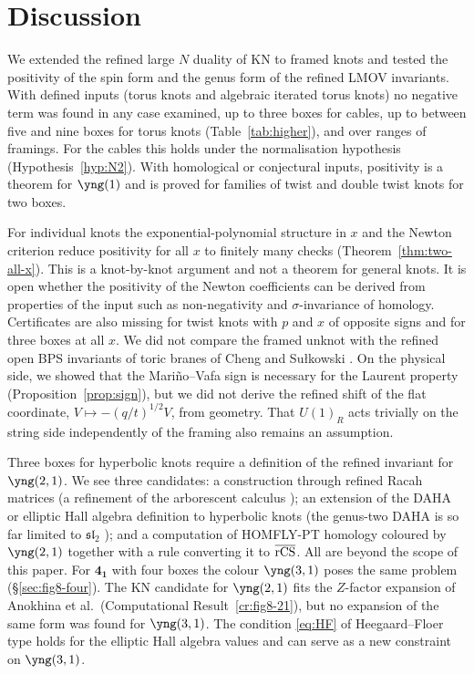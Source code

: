 \section{Discussion}\label{sec:discussion}

We extended the refined large $N$ duality of KN to framed knots and tested the positivity of the spin form and the genus form of the refined LMOV invariants.
With defined inputs (torus knots and algebraic iterated torus knots) no negative term was found in any case examined,
up to three boxes for cables, up to between five and nine boxes for torus knots (Table~\ref{tab:higher}), and over ranges of framings.
For the cables this holds under the normalisation hypothesis (Hypothesis~\ref{hyp:N2}).
With homological or conjectural inputs, positivity is a theorem for $\yng(1)$ and is proved for families of twist and double twist knots for two boxes.

For individual knots the exponential-polynomial structure in $x$ and the Newton criterion reduce positivity for all $x$ to finitely many checks (Theorem~\ref{thm:two-all-x}).
This is a knot-by-knot argument and not a theorem for general knots.
It is open whether the positivity of the Newton coefficients can be derived from properties of the input such as non-negativity and $\sigma$-invariance of homology.
Certificates are also missing for twist knots with $p$ and $x$ of opposite signs and for three boxes at all $x$.
We did not compare the framed unknot with the refined open BPS invariants of toric branes of Cheng and Su\l{}kowski \cite{Cheng21}.
On the physical side, we showed that the Mari\~no--Vafa sign is necessary for the Laurent property (Proposition~\ref{prop:sign}),
but we did not derive the refined shift of the flat coordinate, $V\mapsto-(q/t)^{1/2}V$, from geometry.
That $U(1)_R$ acts trivially on the string side independently of the framing also remains an assumption.

Three boxes for hyperbolic knots require a definition of the refined invariant for $\yng(2,1)$. We see three candidates:
a construction through refined Racah matrices (a refinement of the arborescent calculus \cite{Mironov16});
an extension of the DAHA or elliptic Hall algebra definition to hyperbolic knots (the genus-two DAHA is so far limited to $\mathfrak{sl}_2$ \cite{Arthamonov15});
and a computation of HOMFLY-PT homology coloured by $\yng(2,1)$ together with a rule converting it to $\overline{\mathrm{rCS}}$.
All are beyond the scope of this paper.
For $\mathbf{4_1}$ with four boxes the colour $\yng(3,1)$ poses the same problem (\S\ref{sec:fig8-four}).
The KN candidate for $\yng(2,1)$ fits the $Z$-factor expansion of Anokhina et al.\ (Computational Result~\ref{cr:fig8-21}), but no expansion of the same form was found for $\yng(3,1)$.
The condition \eqref{eq:HF} of Heegaard--Floer type holds for the elliptic Hall algebra values and can serve as a new constraint on $\yng(3,1)$.

